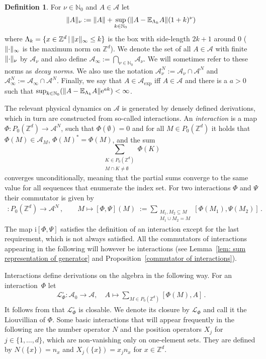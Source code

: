\documentclass[a4paper]{article}
\newcommand{\E}{\mathbb{E}}
\newcommand{\e}{\mathrm{e}}
\renewcommand{\i}{\mathrm{i}}
\renewcommand{\Phi}{\varPhi}
\renewcommand{\Psi}{\varPsi}
\newcommand{\La}{\Lambda}
\newcommand{\N}{\mathbb{N}}
\newcommand{\Z}{\mathbb{Z}}
\newcommand{\mA}{\mathcal{A}}
\newcommand{\mL}{\mathcal{L}}
\DeclarePairedDelimiter\norm{\lVert}{\rVert}
\theoremstyle{plain}
\theoremstyle{definition}
\newtheorem{definition}[theorem]{Definition}
\theoremstyle{remark}
\renewcommand{\(}{\left(}
\renewcommand{\)}{\right)}
\begin{document}
\begin{definition} \label{dfn:Dinfty}
    For $\nu \in \N_0$ and $A \in \mA$ let
    \begin{align*}
        \norm{A}_\nu := \norm{A} + \sup_{k\in \N_0}( \norm{A-\E_{\La_k}A} (1+k)^\nu) 
    \end{align*}
    where $\La_k = \{x\in \Z^d \, | \, \norm{x}_\infty \leq k \}$ is the box with side-length $2k+1$ around $0$ ($\norm{\cdot}_\infty$ is the maximum norm on $\Z^d$).
    We denote the set of all $A\in \mA$ with finite $\norm{\cdot}_\nu$ by $\mA_\nu$ and also define $\mA_{\infty} := \bigcap_{\nu \in \N_0} \mA_\nu$. We will sometimes refer to these norms as \emph{decay norms}. We also use the notation $\mA_\nu^N := \mA_\nu \cap \mA^N$ and $\mA_\infty^N := \mA_\infty \cap \mA^N$. Finally, we say that $A\in \mA_{\exp}$ iff $A\in\mA$ and there is a $a>0$ such that $\sup_{k\in \N_0}( \norm{A-\E_{\La_k}A} \e^{ak}) <\infty$.
\end{definition}





The relevant physical dynamics on $\mA$ is generated by densely defined derivations, which in turn are constructed from so-called interactions.
    An \emph{interaction} is a map $\Phi: P_0(\Z^d) \to \mA^N$, such that $\Phi(\emptyset) = 0$ and for all $M\in P_0(\Z^d)$ it holds that $\Phi(M) \in \mA_M$, $\Phi(M)^* = \Phi(M)$, and the sum 
    \[\sum_{\substack{K\in P_0(\Z^d)\\ M\cap K \neq \emptyset}} \Phi(K)\] 
    converges unconditionally, meaning that the partial sums converge to the same value for all sequences that enumerate the index set. 
    For two interactions   $\Phi$ and $\Psi$ their commutator is given by
    \begin{align*}
        [\Phi,\Psi]: P_0(\Z^d) \to \mA^N\,,\qquad M\mapsto 
        [\Phi,\Psi](M) \;:= \sum_{\substack{M_1,M_2 \subseteq M\\ M_1 \cup M_2= M}} [\Phi(M_1),\Psi(M_2)] \, .
    \end{align*}
    The map $\i[\Phi,\Psi]$ satisfies the definition of an interaction except for the last requirement, which is not always satisfied. All the commutators of interactions appearing in the following will however be interactions (see  Lemma~\ref{lem: sum representation of generator} and Proposition~\ref{commutator of interactions}).
 

Interactions  define derivations on the algebra in the following way.    
    For an interaction~$\Phi$ let
    \begin{align*}
        \mL_{\Phi}^\circ: \mA_0 \to \mA,\quad A\mapsto \sum_{M\in P_0(\Z^d)} [\Phi(M),A] \, .
    \end{align*}
    It follows from \cite[Propositions~3.1.15 and~3.2.22]{bratteliI} that $\mL_{\Phi}^\circ$ is closable. We denote its closure by $\mL_{\Phi}$ and call it the Liouvillian of $\Phi$.
Some basic interactions that will appear frequently in the following are the number operator $N$ and the position operators $X_j$ for $j\in\{1,\dots, d\}$, which are non-vanishing only on one-element sets. They are defined by $N(\{x\}) = n_x$ and $X_j(\{x\})= x_j n_x$ for $x\in\Z^d$.
\end{document}
